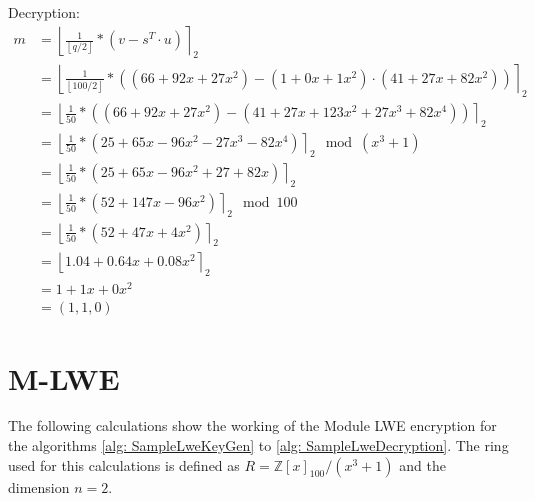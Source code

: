 Decryption:
\begin{align*}
  m & = \left\lfloor \frac{1}{\left\lfloor q/2\right\rfloor}*(v-s^T \cdot u)\right\rceil _2                                               \\
    & = \left\lfloor \frac{1}{\left\lfloor 100/2\right\rfloor}*((66 + 92x + 27x^2 )- (1 + 0x + 1x^2) \cdot (41+27x+82x^2))\right\rceil _2 \\
    & = \left\lfloor \frac{1}{50}*((66 + 92x + 27x^2 )- (41 + 27x + 123x^2 + 27x^3 + 82x^4))\right\rceil _2                               \\
    & = \left\lfloor \frac{1}{50}*(25 + 65x - 96x^2 - 27x^3 - 82x^4)\right\rceil _2 \mod (x^3+1)                                          \\
    & = \left\lfloor \frac{1}{50}*(25 + 65x - 96x^2 + 27 + 82x)\right\rceil _2                                                            \\
    & = \left\lfloor \frac{1}{50}*(52+147x-96x^2)\right\rceil _2 \mod 100                                                                 \\
    & = \left\lfloor \frac{1}{50}*(52+47x+4x^2)\right\rceil _2                                                                            \\
    & = \left\lfloor 1.04 + 0.64x + 0.08x^2\right\rceil _2                                                                                \\
    & = 1 + 1x + 0x^2                                                                                                                     \\
    & = (1, 1, 0)
\end{align*}

\section{M-LWE}
\label{app:MlweExampleCalc}
The following calculations show the working of the Module LWE encryption for the algorithms \ref{alg: SampleLweKeyGen} to \ref{alg: SampleLweDecryption}. The ring used for this calculations is defined as $R=\mathbb{Z}[x]_{100}/(x^3+1)$ and the dimension $n=2$.

